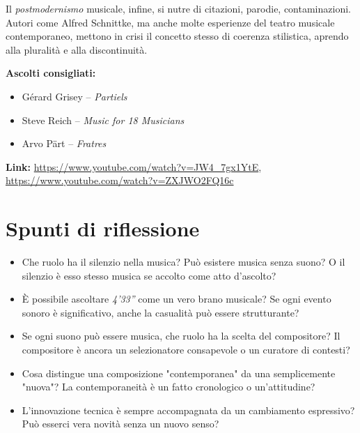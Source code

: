 \documentclass[12pt,a4paper]{article}
\begin{document}
Il \emph{postmodernismo} musicale, infine, si nutre di citazioni, parodie, contaminazioni. Autori come Alfred Schnittke, ma anche molte esperienze del teatro musicale contemporaneo, mettono in crisi il concetto stesso di coerenza stilistica, aprendo alla pluralit\`a e alla discontinuit\`a.

\textbf{Ascolti consigliati:}
\begin{itemize}
  \item G\'erard Grisey -- \textit{Partiels}
  \item Steve Reich -- \textit{Music for 18 Musicians}
  \item Arvo P\"art -- \textit{Fratres}
\end{itemize}
\textbf{Link:} \url{https://www.youtube.com/watch?v=JW4_7gx1YtE}, \url{https://www.youtube.com/watch?v=ZXJWO2FQ16c}

\section{Spunti di riflessione}
\begin{itemize}
  \item Che ruolo ha il silenzio nella musica? \newline
  Pu\`o esistere musica senza suono? O il silenzio \`e esso stesso musica se accolto come atto d’ascolto?

  \item \`E possibile ascoltare \emph{4’33”} come un vero brano musicale? \newline
  Se ogni evento sonoro \`e significativo, anche la casualit\`a pu\`o essere strutturante?

  \item Se ogni suono pu\`o essere musica, che ruolo ha la scelta del compositore? \newline
  Il compositore \`e ancora un selezionatore consapevole o un curatore di contesti?

  \item Cosa distingue una composizione "contemporanea" da una semplicemente "nuova"? \newline
  La contemporaneit\`a \`e un fatto cronologico o un’attitudine?

  \item L’innovazione tecnica \`e sempre accompagnata da un cambiamento espressivo? \newline
  Pu\`o esserci vera novit\`a senza un nuovo senso?
\end{itemize}
\end{document}
